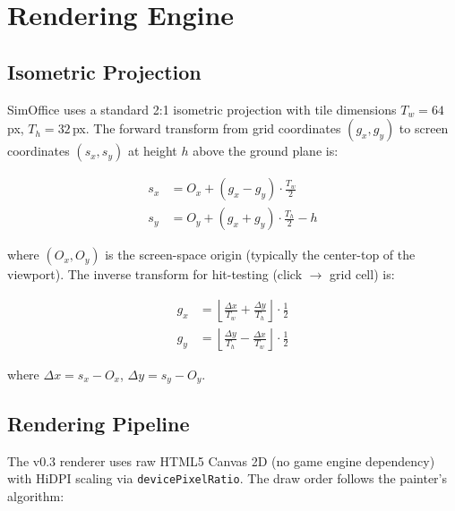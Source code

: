 \documentclass[11pt,letterpaper]{article}
\begin{document}
\section{Rendering Engine}

\subsection{Isometric Projection}

SimOffice uses a standard 2:1 isometric projection with tile dimensions $T_w = 64$\,px, $T_h = 32$\,px. The forward transform from grid coordinates $(g_x, g_y)$ to screen coordinates $(s_x, s_y)$ at height $h$ above the ground plane is:

\begin{align}
  s_x &= O_x + (g_x - g_y) \cdot \frac{T_w}{2} \\
  s_y &= O_y + (g_x + g_y) \cdot \frac{T_h}{2} - h
\end{align}

\noindent
where $(O_x, O_y)$ is the screen-space origin (typically the center-top of the viewport). The inverse transform for hit-testing (click $\to$ grid cell) is:

\begin{align}
  g_x &= \left\lfloor \frac{\Delta x}{T_w} + \frac{\Delta y}{T_h} \right\rfloor \cdot \frac{1}{2} \\
  g_y &= \left\lfloor \frac{\Delta y}{T_h} - \frac{\Delta x}{T_w} \right\rfloor \cdot \frac{1}{2}
\end{align}

\noindent
where $\Delta x = s_x - O_x$, $\Delta y = s_y - O_y$.

\subsection{Rendering Pipeline}

The v0.3 renderer uses raw HTML5 Canvas 2D (no game engine dependency) with HiDPI scaling via \texttt{devicePixelRatio}. The draw order follows the painter's algorithm:
\end{document}
